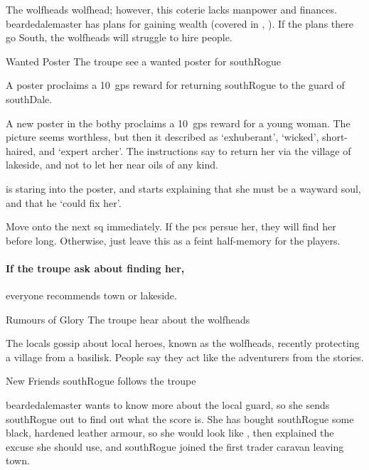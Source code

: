 \label{wolfHeads}

\noindent
The \glspl{wolfhead} \glsdesc{wolfhead}; however, this coterie lacks manpower and finances.
\Gls{beardedalemaster} has plans for gaining wealth (covered in , ).
If the plans there go South, the \glspl{wolfhead} will struggle to hire people.

{\squash Wanted Poster}%
{The troupe see a wanted poster for \gls{southRogue}}%

A poster proclaims a 10~\glspl{gp} reward for returning \gls{southRogue} to the \gls{guard} of \gls{southDale}.

\begin{boxtext}
  A new poster in the \gls{bothy} proclaims a 10~\glspl{gp} reward for a young woman.
  The picture seems worthless, but then it described as `exhuberant', `wicked', short-haired, and `expert archer'.
  The instructions say to return her via the \gls{village} of \gls{lakeside}, and not to let her near oils of any kind.

   is staring into the poster, and starts explaining that she must be a wayward soul, and that he `could fix her'.
\end{boxtext}

Move onto the next \gls{sq} immediately.
If the \glspl{pc} persue her, they will find her before long.
Otherwise, just leave this as a feint half-memory for the players.

\paragraph{If the troupe ask about finding her,}
everyone recommends \gls{town} or \gls{lakeside}.

{\squash Rumours of Glory}%
{The troupe hear about the \glspl{wolfhead}}%

The locals gossip about local heroes, known as the \glspl{wolfhead}, recently protecting a \gls{village} from a basilisk.
People say they act like the adventurers from the stories.

{New Friends}%
{\Gls{southRogue} follows the troupe}%

\Gls{beardedalemaster} wants to know more about the local \gls{guard}, so she sends \gls{southRogue} out to find out what the score is.
She has bought \gls{southRogue} some black, hardened leather armour, so she would look like , then explained the excuse she should use, and \gls{southRogue} joined the first trader caravan leaving \gls{town}.

